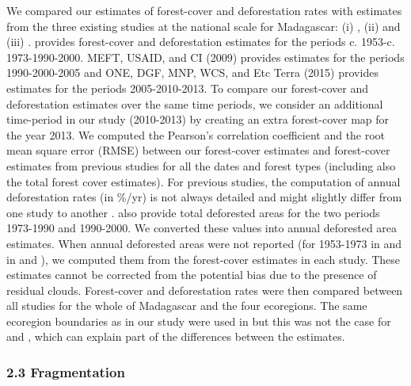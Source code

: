 \documentclass[]{article}
\begin{document}
We compared our estimates of forest-cover and deforestation rates with
estimates from the three existing studies at the national scale for
Madagascar: (i) \citep{Harper2007}, (ii) \citep{MEFT2009} and (iii)
\citep{ONE2015}. \citet{Harper2007} provides forest-cover and
deforestation estimates for the periods c. 1953-c. 1973-1990-2000. MEFT,
USAID, and CI (2009) provides estimates for the periods 1990-2000-2005
and ONE, DGF, MNP, WCS, and Etc Terra (2015) provides estimates for the
periods 2005-2010-2013. To compare our forest-cover and deforestation
estimates over the same time periods, we consider an additional
time-period in our study (2010-2013) by creating an extra forest-cover
map for the year 2013. We computed the Pearson's correlation coefficient
and the root mean square error (RMSE) between our forest-cover estimates
and forest-cover estimates from previous studies for all the dates and
forest types (including also the total forest cover estimates). For
previous studies, the computation of annual deforestation rates (in
\%/yr) is not always detailed and might slightly differ from one study
to another \citep[see][]{Puyravaud2003}. \citet{Harper2007} also provide
total deforested areas for the two periods 1973-1990 and 1990-2000. We
converted these values into annual deforested area estimates. When
annual deforested areas were not reported (for 1953-1973 in
\citet{Harper2007} and in \citet{MEFT2009} and \citet{ONE2015}), we
computed them from the forest-cover estimates in each study. These
estimates cannot be corrected from the potential bias due to the
presence of residual clouds. Forest-cover and deforestation rates were
then compared between all studies for the whole of Madagascar and the
four ecoregions. The same ecoregion boundaries as in our study were used
in \citet{ONE2015} but this was not the case for \citet{Harper2007} and
\citet{MEFT2009}, which can explain part of the differences between the
estimates.

\hypertarget{fragmentation}{%
\subsubsection{2.3 Fragmentation}\label{fragmentation}}
\end{document}
